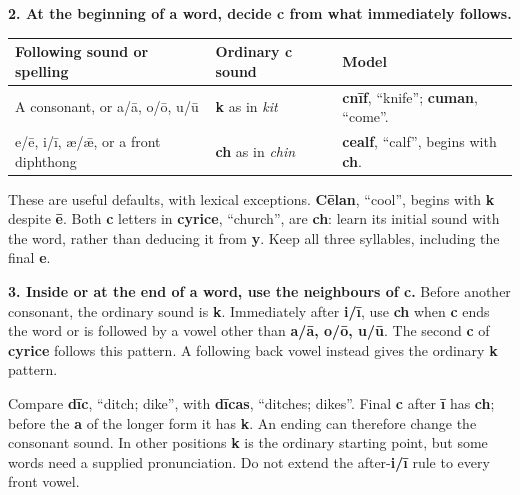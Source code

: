 \textbf{2. At the beginning of a word, decide c from what immediately follows.}\par\nobreak

\par\begingroup
\fontsize{10.5}{13.2}\selectfont
\setlength{\LTleft}{0pt}\setlength{\LTright}{\fill}
\noindent
\begin{tabular}{@{}>{\raggedright\arraybackslash}p{49.566mm}>{\raggedright\arraybackslash}p{27.057mm}>{\raggedright\arraybackslash}p{41.752mm}@{}}
\toprule
\textbf{Following sound or spelling} & \textbf{Ordinary c sound} & \textbf{Model} \\
\midrule
A consonant, or a/\allowbreak{}ā, o/\allowbreak{}ō, u/\allowbreak{}ū & \textbf{k} as in \emph{kit} & \textbf{cnīf}, “knife”; \textbf{cuman}, “come”. \\
e/\allowbreak{}ē, i/\allowbreak{}ī, æ/\allowbreak{}ǣ, or a front diphthong & \textbf{ch} as in \emph{chin} & \textbf{cealf}, “calf”, begins with \textbf{ch}. \\
\bottomrule
\end{tabular}
\par\endgroup

These are useful defaults, with lexical exceptions. \textbf{Cēlan}, “cool”, begins with \textbf{k} despite \textbf{ē}. Both \textbf{c} letters in \textbf{cyrice}, “church”, are \textbf{ch}: learn its initial sound with the word, rather than deducing it from \textbf{y}. Keep all three syllables, including the final \textbf{e}.

\textbf{3. Inside or at the end of a word, use the neighbours of c.} Before another consonant, the ordinary sound is \textbf{k}. Immediately after \textbf{i/\allowbreak{}ī}, use \textbf{ch} when \textbf{c} ends the word or is followed by a vowel other than \textbf{a/\allowbreak{}ā, o/\allowbreak{}ō, u/\allowbreak{}ū}. The second \textbf{c} of \textbf{cyrice} follows this pattern. A following back vowel instead gives the ordinary \textbf{k} pattern.

Compare \textbf{dīc}, “ditch; dike”, with \textbf{dīcas}, “ditches; dikes”. Final \textbf{c} after \textbf{ī} has \textbf{ch}; before the \textbf{a} of the longer form it has \textbf{k}. An ending can therefore change the consonant sound. In other positions \textbf{k} is the ordinary starting point, but some words need a supplied pronunciation. Do not extend the after-\textbf{i/\allowbreak{}ī} rule to every front vowel.

